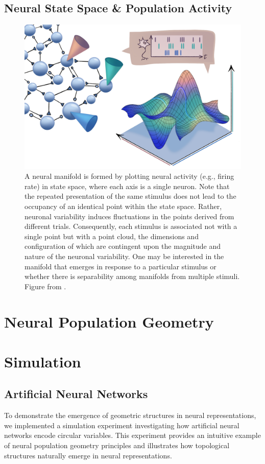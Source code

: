 \documentclass[11pt,a4paper]{article}
\begin{document}
\subsection{Neural State Space \& Population Activity}
\begin{figure}
    \centering
    \includegraphics[width=0.75\linewidth]{manifold_schematic.png}
    \caption{A neural manifold is formed by plotting neural activity (e.g., firing rate) in state space, where each axis is a single neuron. Note that the repeated presentation of the same stimulus does not lead to the occupancy of an identical point within the state space. Rather, neuronal variability induces fluctuations in the points derived from different trials. Consequently, each stimulus is associated not with a single point but with a point cloud, the dimensions and configuration of which are contingent upon the magnitude and nature of the neuronal variability. One may be interested in the manifold that emerges in response to a particular stimulus or whether there is separability among manifolds from multiple stimuli. Figure from \cite{Perich2024}.}
    \label{fig:manifolds}
\end{figure}


\section{Neural Population Geometry}

\section{Simulation}
\subsection{Artificial Neural Networks}

To demonstrate the emergence of geometric structures in neural representations, we implemented a simulation experiment investigating how artificial neural networks encode circular variables. This experiment provides an intuitive example of neural population geometry principles and illustrates how topological structures naturally emerge in neural representations.
\end{document}
